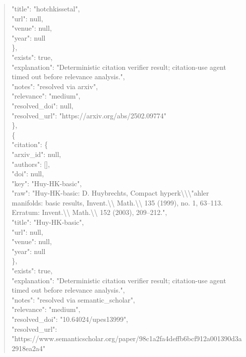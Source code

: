 \documentclass[11pt]{article}
\begin{document}
\begin{quote}
        "title": "hotchkissetal",\\
        "url": null,\\
        "venue": null,\\
        "year": null\\
      \},\\
      "exists": true,\\
      "explanation": "Deterministic citation verifier result; citation-use agent timed out before relevance analysis.",\\
      "notes": "resolved via arxiv",\\
      "relevance": "medium",\\
      "resolved\_doi": null,\\
      "resolved\_url": "https://arxiv.org/abs/2502.09774"\\
    \},\\
    \{\\
      "citation": \{\\
        "arxiv\_id": null,\\
        "authors": [],\\
        "doi": null,\\
        "key": "Huy-HK-basic",\\
        "raw": "Huy-HK-basic: D. Huybrechts, Compact hyperk\textbackslash{}\textbackslash{}\textbackslash{}"ahler manifolds: basic results, Invent.\textbackslash{}\textbackslash{} Math.\textbackslash{}\textbackslash{} 135 (1999), no. 1, 63--113. Erratum: Invent.\textbackslash{}\textbackslash{} Math.\textbackslash{}\textbackslash{} 152 (2003), 209--212.",\\
        "title": "Huy-HK-basic",\\
        "url": null,\\
        "venue": null,\\
        "year": null\\
      \},\\
      "exists": true,\\
      "explanation": "Deterministic citation verifier result; citation-use agent timed out before relevance analysis.",\\
      "notes": "resolved via semantic\_scholar",\\
      "relevance": "medium",\\
      "resolved\_doi": "10.64024/upes13999",\\
      "resolved\_url": "https://www.semanticscholar.org/paper/98c1a2fa4deffb6bcf912a001390d3a2918ea2a4"\\

\end{quote}
\end{document}
